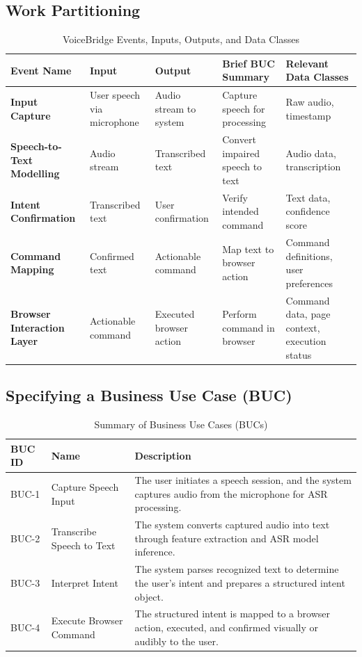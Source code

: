 \documentclass[11pt]{article}
\begin{document}
\subsection{Work Partitioning}
\begin{table}[H]
\centering
\begin{tabularx}{\textwidth}{X X X X X}
\toprule
\textbf{Event Name} & \textbf{Input} & \textbf{Output} & \textbf{Brief BUC Summary} & \textbf{Relevant Data Classes} \\
\midrule
\textbf{Input Capture} & User speech via microphone & Audio stream to system & Capture speech for processing & Raw audio, timestamp \\
\hline
\textbf{Speech-to-Text Modelling} & Audio stream & Transcribed text & Convert impaired speech to text & Audio data, transcription \\
\hline
\textbf{Intent Confirmation} & Transcribed text & User confirmation & Verify intended command & Text data, confidence score \\
\hline
\textbf{Command Mapping} & Confirmed text & Actionable command & Map text to browser action & Command definitions, user preferences \\
\hline
\textbf{Browser Interaction Layer} & Actionable command & Executed browser action & Perform command in browser & Command data, page context, execution status \\
\bottomrule
\end{tabularx}
\caption{VoiceBridge Events, Inputs, Outputs, and Data Classes}
\label{tab:voicebridge-events}
\end{table}

\subsection{Specifying a Business Use Case (BUC)} 


\begin{table}[H]
\centering
\caption{Summary of Business Use Cases (BUCs)}
\begin{tabularx}{\textwidth}{p{2cm}p{3cm}X}
\toprule
\textbf{BUC ID} & \textbf{Name} & \textbf{Description} \\
\midrule
BUC-1 & Capture Speech Input & The user initiates a speech session, and the system captures audio from the microphone for ASR processing. \\
\hline
BUC-2 & Transcribe Speech to Text & The system converts captured audio into text through feature extraction and ASR model inference. \\
\hline
BUC-3 & Interpret Intent & The system parses recognized text to determine the user’s intent and prepares a structured intent object. \\
\hline
BUC-4 & Execute Browser Command & The structured intent is mapped to a browser action, executed, and confirmed visually or audibly to the user. \\
\bottomrule
\end{tabularx}
\end{table}
\end{document}
